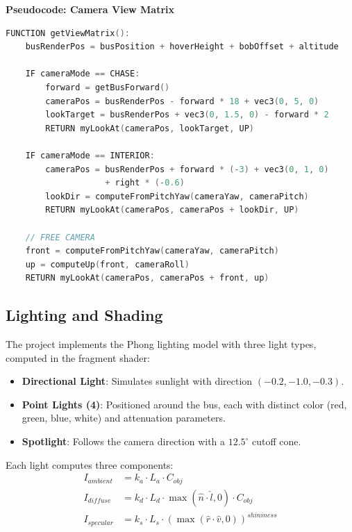 \documentclass[12pt,a4paper]{article}
\begin{document}
\textbf{Pseudocode: Camera View Matrix}
\begin{lstlisting}[language=C++, caption={Camera View Matrix Selection}]
FUNCTION getViewMatrix():
    busRenderPos = busPosition + hoverHeight + bobOffset + altitude

    IF cameraMode == CHASE:
        forward = getBusForward()
        cameraPos = busRenderPos - forward * 18 + vec3(0, 5, 0)
        lookTarget = busRenderPos + vec3(0, 1.5, 0) - forward * 2
        RETURN myLookAt(cameraPos, lookTarget, UP)

    IF cameraMode == INTERIOR:
        cameraPos = busRenderPos + forward * (-3) + vec3(0, 1, 0)
                    + right * (-0.6)
        lookDir = computeFromPitchYaw(cameraYaw, cameraPitch)
        RETURN myLookAt(cameraPos, cameraPos + lookDir, UP)

    // FREE CAMERA
    front = computeFromPitchYaw(cameraYaw, cameraPitch)
    up = computeUp(front, cameraRoll)
    RETURN myLookAt(cameraPos, cameraPos + front, up)
\end{lstlisting}

\subsection{Lighting and Shading}

The project implements the Phong lighting model with three light types, computed in the fragment shader:

\begin{itemize}
    \item \textbf{Directional Light}: Simulates sunlight with direction $(-0.2, -1.0, -0.3)$.
    \item \textbf{Point Lights (4)}: Positioned around the bus, each with distinct color (red, green, blue, white) and attenuation parameters.
    \item \textbf{Spotlight}: Follows the camera direction with a $12.5^\circ$ cutoff cone.
\end{itemize}

Each light computes three components:
\begin{align}
    I_{ambient} &= k_a \cdot L_a \cdot C_{obj} \\
    I_{diffuse} &= k_d \cdot L_d \cdot \max(\hat{n} \cdot \hat{l}, 0) \cdot C_{obj} \\
    I_{specular} &= k_s \cdot L_s \cdot (\max(\hat{r} \cdot \hat{v}, 0))^{shininess}
\end{align}
\end{document}

